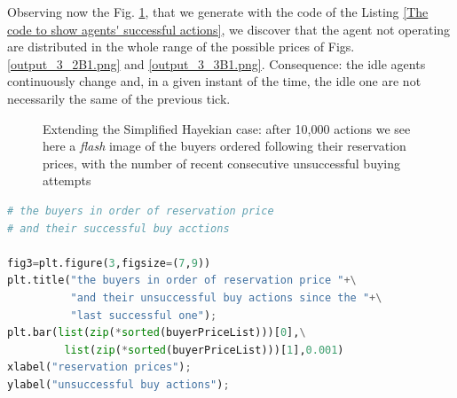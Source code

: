 \documentclass[10pt]{report}
\begin{document}
\begin{appendices}
\label{inspiration}Observing now the Fig. \ref{output_4_0B1.png}, that we generate with the code of the Listing \ref{The code to show agents' successful actions}, we discover that the agent not operating are distributed in the whole range of the possible prices of Figs. \ref{output_3_2B1.png} and \ref{output_3_3B1.png}. Consequence: the idle agents continuously change and, in a given instant of the time, the idle one are not necessarily the same of the previous tick.  

\begin{figure}[H]
\begin{center}
\caption{Extending the Simplified Hayekian case: after 10,000 actions we see here a \emph{flash} image of the buyers ordered  following their reservation prices, with the number of recent consecutive unsuccessful buying attempts}
\label{output_4_0B1.png}
\end{center}
\end{figure}


\begin{lstlisting}[language=Python, caption=The code to show agents' successful actions, 
label={The code to show agents' successful actions},basicstyle=\ttfamily\footnotesize]
# the buyers in order of reservation price 
# and their successful buy acctions

fig3=plt.figure(3,figsize=(7,9))
plt.title("the buyers in order of reservation price "+\
          "and their unsuccessful buy actions since the "+\
          "last successful one");
plt.bar(list(zip(*sorted(buyerPriceList)))[0],\
         list(zip(*sorted(buyerPriceList)))[1],0.001)
xlabel("reservation prices");
ylabel("unsuccessful buy actions");
\end{lstlisting}






\end{appendices}
\end{document}
